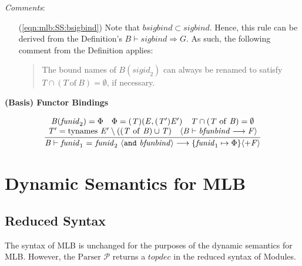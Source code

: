 \documentclass[draft]{article}
\renewcommand{\mit}[1]{\mathit{#1}}
\newcommand{\mrm}[1]{\mathrm{#1}}
\newcommand{\mtt}[1]{\mathtt{#1}}
\newcommand{\mcal}[1]{\mathcal{#1}}
\newenvironment{stackAux}[2]{%
\setlength{\arraycolsep}{0pt}
\begin{array}[#1]{#2}}{
\end{array}}
\newenvironment{stackCC}{
\begin{stackAux}{c}{c}}{\end{stackAux}}
\newcommand{\infrule}[2]{{\frac{\displaystyle\strut{#1}}{\displaystyle\strut{#2}}}}
\newcommand{\judge}[2]{\infrule{#1}{#2}}
\begin{document}
\begin{samepage}
\noindent
\textit{Comments}:
\begin{itemize}
\item[(\ref{eqn:mlb:SS:bsigbind})] Note that $\mit{bsigbind} \subset
\mit{sigbind}$.  Hence, this rule can be derived from the
Definition's $\mit{B} \vdash \mit{sigbind} \Rightarrow \mit{G}$.  As such, the
following comment from the Definition applies:
\begin{quote}
The bound names of $\mit{B}(\mit{sigid}_2)$ can always be renamed to
satisfy $\mit{T} \cap (\mit{T}~\mrm{of}~\mit{B}) = \emptyset$, if necessary.
\end{quote}
\end{itemize}
\end{samepage}

\vspace{2\parsep}
{\large\noindent
\textbf{(Basis) Functor Bindings} \hfill 
\fbox{$\mit{B} \vdash \mit{bfunbind} \longrightarrow \mit{F}$}
}\nopagebreak

\begin{equation}
\judge{
\begin{stackCC}
\mit{B}(\mit{funid}_2) = \Phi \quad \Phi = (\mit{T})(\mit{E},(\mit{T}')\mit{E}') \quad
\mit{T} \cap (\mit{T}~\mrm{of}~\mit{B}) = \emptyset \\
\mit{T}' = \mrm{tynames}~\mit{E}' \setminus ((\mit{T}~\mrm{of}~\mit{B}) \cup \mit{T}) \quad
\langle\mit{B} \vdash \mit{bfunbind} \longrightarrow \mit{F}\rangle
\end{stackCC}
}{
\mit{B} \vdash \mit{funid}_1 ~\mtt{=}~ \mit{funid}_2 ~\langle\mtt{and}~\mit{bfunbind}\rangle \longrightarrow 
\{\mit{funid}_1 \mapsto \Phi\} \langle+ \mit{F}\rangle
}
\end{equation}
%
\section{Dynamic Semantics for MLB}
%
\subsection{Reduced Syntax}
The syntax of MLB is unchanged for the purposes of the dynamic
semantics for MLB.  However, the $\mrm{Parser}$ $\mcal{P}$ returns a
$\mit{topdec}$ in the reduced syntax of Modules.
%
\end{document}
